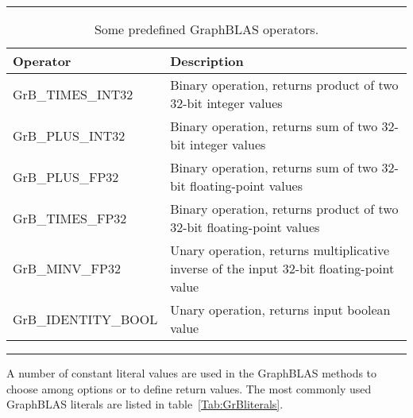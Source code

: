 \begin{table}[h]
\hrule
\begin{center}
\caption{Some predefined GraphBLAS operators.}
\label{Tab:GrBops}
\begin{tabular}{lp{5.25cm}}
Operator                       & Description  \\
\hline
	{\sf GrB\_TIMES\_INT32}    & Binary operation, returns  product of two 32-bit integer values \\
	{\sf GrB\_PLUS\_INT32}     & Binary operation, returns  sum of two 32-bit integer values \\
	{\sf GrB\_PLUS\_FP32}      & Binary operation, returns  sum of two 32-bit floating-point values \\
	{\sf GrB\_TIMES\_FP32}     & Binary operation, returns  product of two 32-bit floating-point values \\
	{\sf GrB\_MINV\_FP32}      & Unary operation, returns  multiplicative inverse of the input 32-bit floating-point value \\
	{\sf GrB\_IDENTITY\_BOOL}  & Unary operation, returns input boolean value \\
\end{tabular}
\end{center}
\hrule
\end{table}
A number of constant literal values are used in the GraphBLAS methods to 
choose among options or to define return values.
The most commonly used GraphBLAS literals are listed in table~\ref{Tab:GrBliterals}.
